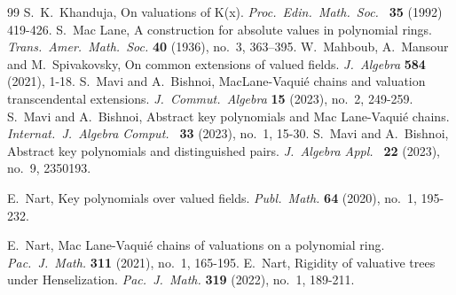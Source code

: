 \documentclass[11pt]{amsart}
\theoremstyle{definition}
\theoremstyle{remark}
\numberwithin{equation}{section}
\begin{document}
\begin{thebibliography}{99}
		 S.\ K.\ Khanduja, On valuations of K(x). {\it Proc.\ Edin.\ Math.\ Soc.\ } {\bf 35} (1992) 419-426.
		 S.\  Mac Lane,  A construction for absolute values in polynomial rings. {\it Trans.\  Amer.\  Math.\  Soc.} {\bf 40} (1936), no.\  3, 363--395.
	 W.\ Mahboub, A.\ Mansour and M.\ Spivakovsky, On common extensions of valued fields. {\it J.\ Algebra} {\bf 584} (2021), 1-18.
	 S.\ Mavi and A.\ Bishnoi, MacLane-Vaqui\'e chains and valuation transcendental extensions. {\it J.\ Commut.\ Algebra} {\bf 15} (2023), no.\ 2, 249-259.
	 S.\ Mavi and A.\ Bishnoi, Abstract key polynomials and Mac Lane-Vaqui\'e chains. {\it Internat.\ J.\ Algebra Comput.\ } {\bf 33} (2023), no.\ 1, 15-30.
	 S.\ Mavi and A.\ Bishnoi, Abstract key polynomials and distinguished pairs. {\it J.\ Algebra Appl.\ } {\bf 22} (2023), no.\ 9, 2350193.	
	
	
	 E.\ Nart, Key polynomials over valued fields. {\it Publ.\ Math.} {\bf 64} (2020), no.\ 1, 195-232.
	
	 E.\ Nart, Mac Lane-Vaquié chains of valuations on a polynomial ring.  {\it  Pac.\	J.\ Math.} {\bf 311} (2021), no.\ 1, 165-195.
	 E.\ Nart, Rigidity of valuative trees under Henselization.  {\it  Pac.\	J.\ Math.} {\bf 319} (2022), no.\ 1, 189-211.
	

\end{thebibliography}
\end{document}
